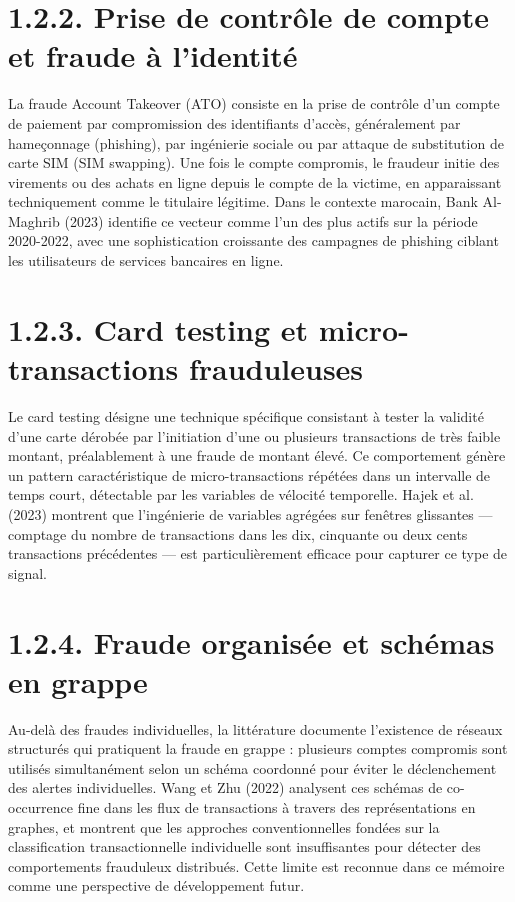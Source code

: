\section{1.2.2. Prise de contrôle de compte et fraude à l'identité}

La fraude Account Takeover (ATO) consiste en la prise de contrôle d'un compte de paiement par compromission des identifiants d'accès, généralement par hameçonnage (phishing), par ingénierie sociale ou par attaque de substitution de carte SIM (SIM swapping). Une fois le compte compromis, le fraudeur initie des virements ou des achats en ligne depuis le compte de la victime, en apparaissant techniquement comme le titulaire légitime. Dans le contexte marocain, Bank Al-Maghrib (2023) identifie ce vecteur comme l'un des plus actifs sur la période 2020-2022, avec une sophistication croissante des campagnes de phishing ciblant les utilisateurs de services bancaires en ligne.

\section{1.2.3. Card testing et micro-transactions frauduleuses}

Le card testing désigne une technique spécifique consistant à tester la validité d'une carte dérobée par l'initiation d'une ou plusieurs transactions de très faible montant, préalablement à une fraude de montant élevé. Ce comportement génère un pattern caractéristique de micro-transactions répétées dans un intervalle de temps court, détectable par les variables de vélocité temporelle. Hajek et al. (2023) montrent que l'ingénierie de variables agrégées sur fenêtres glissantes — comptage du nombre de transactions dans les dix, cinquante ou deux cents transactions précédentes — est particulièrement efficace pour capturer ce type de signal.

\section{1.2.4. Fraude organisée et schémas en grappe}

Au-delà des fraudes individuelles, la littérature documente l'existence de réseaux structurés qui pratiquent la fraude en grappe : plusieurs comptes compromis sont utilisés simultanément selon un schéma coordonné pour éviter le déclenchement des alertes individuelles. Wang et Zhu (2022) analysent ces schémas de co-occurrence fine dans les flux de transactions à travers des représentations en graphes, et montrent que les approches conventionnelles fondées sur la classification transactionnelle individuelle sont insuffisantes pour détecter des comportements frauduleux distribués. Cette limite est reconnue dans ce mémoire comme une perspective de développement futur.

